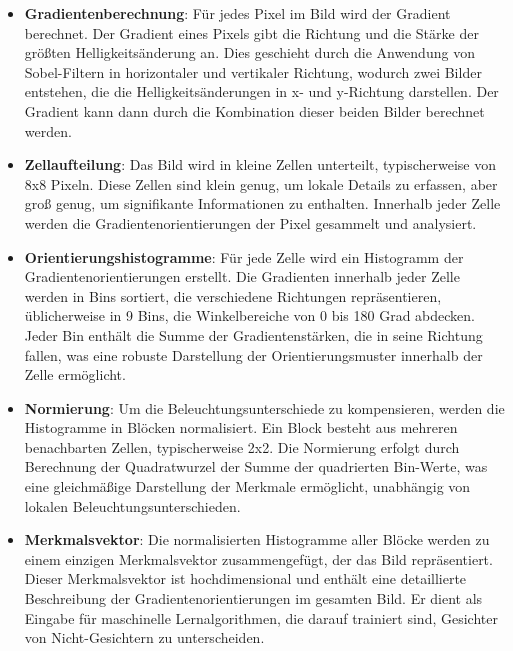 \begin{itemize}
    \item \textbf{Gradientenberechnung}: Für jedes Pixel im Bild wird der Gradient berechnet. Der Gradient eines Pixels gibt die Richtung und die Stärke der größten Helligkeitsänderung an\cite{hog_quelle}. Dies geschieht durch die Anwendung von Sobel-Filtern in horizontaler und vertikaler Richtung, wodurch zwei Bilder entstehen, die die Helligkeitsänderungen in x- und y-Richtung darstellen. Der Gradient kann dann durch die Kombination dieser beiden Bilder berechnet werden.
    
    \item \textbf{Zellaufteilung}: Das Bild wird in kleine Zellen unterteilt, typischerweise von 8x8 Pixeln. Diese Zellen sind klein genug, um lokale Details zu erfassen, aber groß genug, um signifikante Informationen zu enthalten. Innerhalb jeder Zelle werden die Gradientenorientierungen der Pixel gesammelt und analysiert.
    
    \item \textbf{Orientierungshistogramme}: Für jede Zelle wird ein Histogramm der Gradientenorientierungen erstellt. Die Gradienten innerhalb jeder Zelle werden in Bins sortiert, die verschiedene Richtungen repräsentieren, üblicherweise in 9 Bins, die Winkelbereiche von 0 bis 180 Grad abdecken. Jeder Bin enthält die Summe der Gradientenstärken, die in seine Richtung fallen, was eine robuste Darstellung der Orientierungsmuster innerhalb der Zelle ermöglicht.
    
    \item \textbf{Normierung}: Um die Beleuchtungsunterschiede zu kompensieren, werden die Histogramme in Blöcken normalisiert. Ein Block besteht aus mehreren benachbarten Zellen, typischerweise 2x2. Die Normierung erfolgt durch Berechnung der Quadratwurzel der Summe der quadrierten Bin-Werte, was eine gleichmäßige Darstellung der Merkmale ermöglicht, unabhängig von lokalen Beleuchtungsunterschieden.
    
    \item \textbf{Merkmalsvektor}: Die normalisierten Histogramme aller Blöcke werden zu einem einzigen Merkmalsvektor zusammengefügt, der das Bild repräsentiert. Dieser Merkmalsvektor ist hochdimensional und enthält eine detaillierte Beschreibung der Gradientenorientierungen im gesamten Bild. Er dient als Eingabe für maschinelle Lernalgorithmen, die darauf trainiert sind, Gesichter von Nicht-Gesichtern zu unterscheiden.
\end{itemize}

